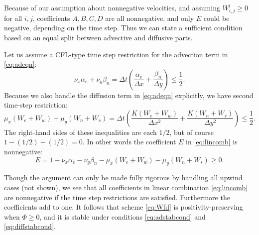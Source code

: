 \documentclass[11pt,final]{amsart}%
\newcommand{\Wlij}{W^l_{i,j}}
\begin{document}
Because of our assumption about nonnegative velocities, and assuming $\Wlij \ge 0$ for all $i,j$, coefficients $A,B,C,D$ are all nonnegative, and only $E$ could be negative, depending on the time step.  Thus we can state a sufficient condition based on an equal split between advective and diffusive parts.

Let us assume a CFL-type time step restriction for the advection term in  \eqref{eq:adeqn}:
\begin{equation}
\nu_x \alpha_e + \nu_y \beta_n = \Delta t \left(\frac{\alpha_e}{\Delta x} + \frac{\beta_n}{\Delta y}\right) \le \frac{1}{2}. \label{eq:adstabcond}
\end{equation}
Because we also handle the diffusion term in \eqref{eq:adeqn} explicitly, we have second time-step restriction:
\begin{equation}
\mu_x (W_e + W_w) + \mu_y (W_n + W_s) = \Delta t \left(\frac{K(W_e + W_w)}{\Delta x^2} + \frac{K(W_n + W_s)}{\Delta y^2}\right) \le \frac{1}{2}. \label{eq:diffstabcond}
\end{equation}
The right-hand sides of these inequalities are each $1/2$, but of course $1-(1/2)-(1/2)=0$.  In other words the coefficient $E$ in \eqref{eq:lincomb} is nonnegative:
	$$E = 1 - \nu_x \alpha_e - \nu_y \beta_n - \mu_x (W_e + W_w) - \mu_y (W_n + W_s) \ge 0.$$

Though the argument can only be made fully rigorous by handling all upwind cases (not shown), we see that all coefficients in linear combination \eqref{eq:lincomb} are nonnegative if the time step restrictions are satisfied.  Furthermore the coefficients add to one.  It follows \citep{MortonMayers} that scheme \eqref{eq:Wfd} is positivity-preserving when $\Phi\ge 0$, and it is stable under conditions \eqref{eq:adstabcond} and \eqref{eq:diffstabcond}.
\end{document}

